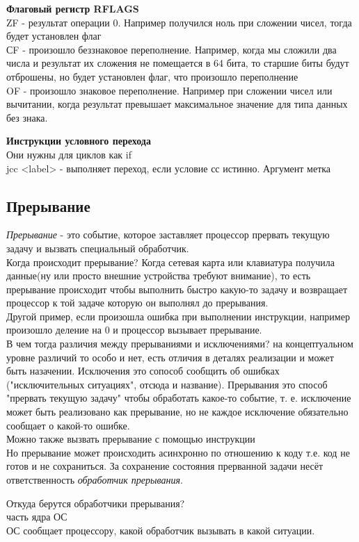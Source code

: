 	\par \textbf{Флаговый регистр RFLAGS}
	\\ ZF - результат операции 0. Например получился ноль при сложении чисел, тогда будет установлен флаг 
	\\ СF - произошло беззнаковое переполнение. Например, когда мы сложили два числа и результат их сложения не помещается в 64 бита, то старшие биты будут отброшены, но будет установлен флаг, что произошло переполнение 
	\\ OF - произошло знаковое переполнение. Например при сложении чисел или вычитании, когда результат превышает максимальное значение для типа данных без знака. 
	
	\par \textbf{Инструкции условного перехода}
	\\ Они нужны для циклов как if
	\\ jcc <label> - выполняет переход, если условие сс истинно. Аргумент метка
	
	\subsection{Прерывание}
	\par \textit{Прерывание} - это событие, которое заставляет процессор прервать текущую задачу и вызвать специальный обработчик.
	\\ Когда происходит прерывание? Когда сетевая карта или клавиатура  получила данные(ну или просто внешние устройства требуют внимание), то есть прерывание происходит чтобы выполнить быстро какую-то задачу и возвращает процессор к той задаче которую он выполнял до прерывания.
	\\ Другой пример, если произошла ошибка при выполнении инструкции, например произошло деление на 0 и процессор вызывает прерывание. 
	\\В чем тогда различия между прерываниями и исключениями? на концептуальном уровне различий то особо и нет, есть отличия в деталях реализации и может быть назачении. Исключения это сопособ сообщить об ошибках ("исключительных ситуациях", отсюда и название). Прерывания это способ "прервать текущую задачу" чтобы обработать какое-то событие, т. е. исключение может быть реализовано как прерывание, но не каждое исключение обязательно сообщает о какой-то ошибке.
	\\ Можно также вызвать прерывание с помощью инструкции
	\\ Но прерывание может происходить асинхронно по отношению к коду т.е. код не готов и не сохраниться. За сохранение состояния прерванной задачи несёт ответственность \textit{обработчик прерывания}.
	\par Откуда берутся обработчики прерывания?
	\\ часть ядра ОС
	\\ ОС сообщает процессору, какой обработчик вызывать в какой ситуации.

